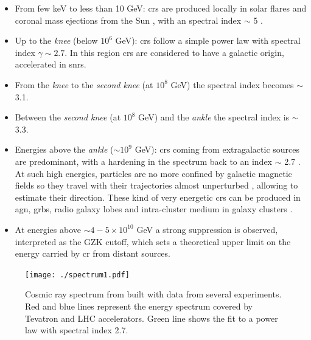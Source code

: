 \documentclass[main.tex]{subfiles}
\begin{document}
\begin{itemize}

    \item From few keV to less than 10 GeV: \glspl{cr} are produced locally in solar flares and coronal mass ejections from the Sun \cite{2017SolarCR_2}, with an spectral index $\sim$ 5 \cite{2017SolarCR}.  
    \item Up to the \textit{knee} (below $10^6$ GeV): \glspl{cr} follow a simple power law with spectral index $\gamma \sim 2.7$. In this region \glspl{cr} are considered to have a galactic origin, accelerated in \glspl{snr}.
    
    \item From the \textit{knee} to the \textit{second knee} (at $10^{8}$ GeV) the spectral index becomes $\sim$ 3.1.
    
    \item Between the \textit{second knee} (at $10^{8}$ GeV) and the \textit{ankle} the spectral index is $\sim$ 3.3.
    
    \item Energies above the \textit{ankle} ($\sim 10^{9}$ GeV): \glspl{cr} coming from extragalactic sources are predominant, with a hardening in the spectrum back to an index $\sim$ 2.7 . At such high energies, particles are no more confined by galactic magnetic fields so they travel with their trajectories almost unperturbed \cite{2013CRbook}, allowing to estimate their direction. These kind of very energetic \glspl{cr} can be produced in \gls{agn}, \glspl{grb}, radio galaxy lobes and intra-cluster medium in galaxy clusters \cite{2019openquestionsUHECR}.
      
    \item At  energies above $\sim 4-5 \times 10^{10}$ GeV a strong suppression is observed, interpreted as the GZK cutoff, which sets a theoretical upper limit on the energy carried by \gls{cr} from distant sources.
    \end{itemize}
    
    \begin{figure}
        \centering
        \texttt{[image: ./spectrum1.pdf]}
        \caption{Cosmic ray spectrum from \cite{crspec} built with data from several experiments. Red and blue lines represent the energy spectrum covered by Tevatron and LHC accelerators. Green line shows the fit to a power law with spectral index 2.7.}
        \label{fig:CRspectrum}
    \end{figure}
    
\end{document}
